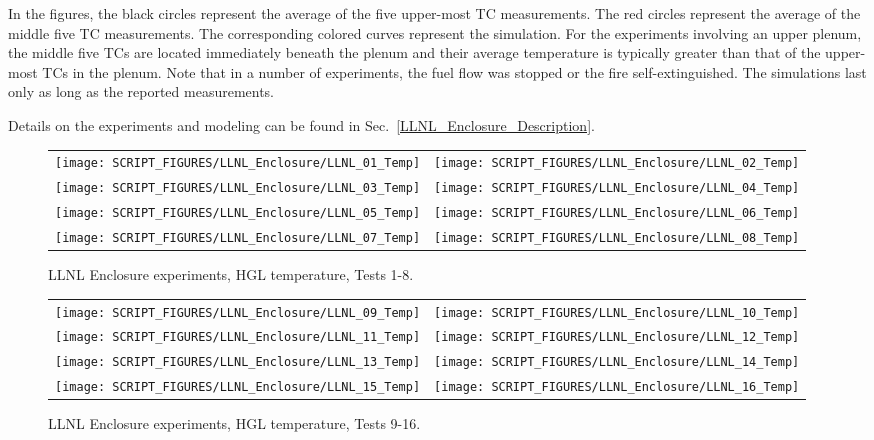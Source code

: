 In the figures, the black circles represent the average of the five upper-most TC measurements. The red circles represent the average of the middle five TC measurements. The corresponding colored curves represent the simulation. For the experiments involving an upper plenum, the middle five TCs are located immediately beneath the plenum and their average temperature is typically greater than that of the upper-most TCs in the plenum. Note that in a number of experiments, the fuel flow was stopped or the fire self-extinguished. The simulations last only as long as the reported measurements.

Details on the experiments and modeling can be found in Sec.~\ref{LLNL_Enclosure_Description}.

\newpage

\begin{figure}[p]
\begin{tabular*}{\textwidth}{l@{\extracolsep{\fill}}r}
\texttt{[image: SCRIPT\_FIGURES/LLNL\_Enclosure/LLNL\_01\_Temp]} &
\texttt{[image: SCRIPT\_FIGURES/LLNL\_Enclosure/LLNL\_02\_Temp]} \\
\texttt{[image: SCRIPT\_FIGURES/LLNL\_Enclosure/LLNL\_03\_Temp]} &
\texttt{[image: SCRIPT\_FIGURES/LLNL\_Enclosure/LLNL\_04\_Temp]} \\
\texttt{[image: SCRIPT\_FIGURES/LLNL\_Enclosure/LLNL\_05\_Temp]} &
\texttt{[image: SCRIPT\_FIGURES/LLNL\_Enclosure/LLNL\_06\_Temp]} \\
\texttt{[image: SCRIPT\_FIGURES/LLNL\_Enclosure/LLNL\_07\_Temp]} &
\texttt{[image: SCRIPT\_FIGURES/LLNL\_Enclosure/LLNL\_08\_Temp]}
\end{tabular*}
\caption[LLNL Enclosure experiments, HGL temperature, Tests 1-8]
{LLNL Enclosure experiments, HGL temperature, Tests 1-8.}
\label{LLNL_Enclosure_Temp_1}
\end{figure}

\begin{figure}[p]
\begin{tabular*}{\textwidth}{l@{\extracolsep{\fill}}r}
\texttt{[image: SCRIPT\_FIGURES/LLNL\_Enclosure/LLNL\_09\_Temp]} &
\texttt{[image: SCRIPT\_FIGURES/LLNL\_Enclosure/LLNL\_10\_Temp]} \\
\texttt{[image: SCRIPT\_FIGURES/LLNL\_Enclosure/LLNL\_11\_Temp]} &
\texttt{[image: SCRIPT\_FIGURES/LLNL\_Enclosure/LLNL\_12\_Temp]} \\
\texttt{[image: SCRIPT\_FIGURES/LLNL\_Enclosure/LLNL\_13\_Temp]} &
\texttt{[image: SCRIPT\_FIGURES/LLNL\_Enclosure/LLNL\_14\_Temp]} \\
\texttt{[image: SCRIPT\_FIGURES/LLNL\_Enclosure/LLNL\_15\_Temp]} &
\texttt{[image: SCRIPT\_FIGURES/LLNL\_Enclosure/LLNL\_16\_Temp]}
\end{tabular*}
\caption[LLNL Enclosure experiments, HGL temperature, Tests 9-16]
{LLNL Enclosure experiments, HGL temperature, Tests 9-16.}
\label{LLNL_Enclosure_Temp_2}
\end{figure}

